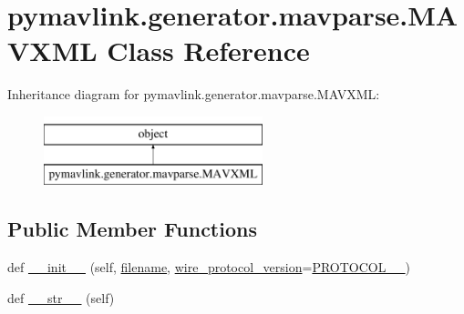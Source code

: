 \hypertarget{classpymavlink_1_1generator_1_1mavparse_1_1MAVXML}{}\section{pymavlink.\+generator.\+mavparse.\+M\+A\+V\+X\+ML Class Reference}
\label{classpymavlink_1_1generator_1_1mavparse_1_1MAVXML}
Inheritance diagram for pymavlink.\+generator.\+mavparse.\+M\+A\+V\+X\+ML\+:\begin{figure}[H]
\begin{center}
\leavevmode
\includegraphics[height=2.000000cm]{classpymavlink_1_1generator_1_1mavparse_1_1MAVXML}
\end{center}
\end{figure}
\subsection*{Public Member Functions}
\begin{DoxyCompactItemize}
\item 
def \mbox{\hyperlink{classpymavlink_1_1generator_1_1mavparse_1_1MAVXML_aa60a4c95dd95e0b15a24e953e240e5ad}{\+\_\+\+\_\+init\+\_\+\+\_\+}} (self, \mbox{\hyperlink{classpymavlink_1_1generator_1_1mavparse_1_1MAVXML_a59d0d9fce063d07328bfee55ab32e1d4}{filename}}, \mbox{\hyperlink{classpymavlink_1_1generator_1_1mavparse_1_1MAVXML_aadee007638f018e0c610f67157ea8cad}{wire\+\_\+protocol\+\_\+version}}=\mbox{\hyperlink{namespacepymavlink_1_1generator_1_1mavparse_a2f1946ee948a684dcbdd0bf5afee5689}{P\+R\+O\+T\+O\+C\+O\+L\+\_\+\_}})
\item 
def \mbox{\hyperlink{classpymavlink_1_1generator_1_1mavparse_1_1MAVXML_a598e17d0cf02fc8a0d557e66b31549a1}{\+\_\+\+\_\+str\+\_\+\+\_\+}} (self)
\end{DoxyCompactItemize}
